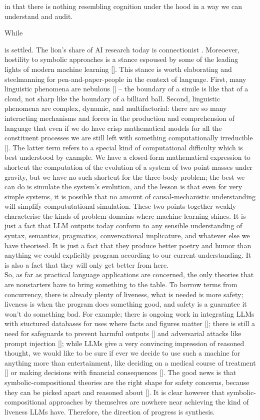 {in that there is nothing resembling cognition under the hood in a way we can understand and audit.

While 

 
} is settled. The lion's share of AI research today is connectionist \cite{}. Moreoever, hostility to symbolic approaches is a stance espoused by some of the leading lights of modern machine learning []. This stance is worth elaborating and steelmanning for pen-and-paper-people in the context of language. First, many linguistic phenomena are nebulous [] -- the boundary of a simile is like that of a cloud, not sharp like the boundary of a billiard ball. Second, linguistic phenomena are complex, dynamic, and multifactorial: there are so many interacting mechanisms and forces in the production and comprehension of language that even if we do have crisp mathematical models for all the constituent processes we are still left with something computationally irreducible []. The latter term refers to a special kind of computational difficulty which is best understood by example. We have a closed-form mathematical expression to shortcut the computation of the evolution of a system of two point masses under gravity, but we have no such shortcut for the three-body problem; the best we can do is simulate the system's evolution, and the lesson is that even for very simple systems, it is possible that no amount of causal-mechanistic understanding will simplify compututational simulation. These two points together weakly characterise the kinds of problem domains where machine learning shines. It is just a fact that LLM outputs today conform to any sensible understanding of syntax, semantics, pragmatics, conversational implicature, and whatever else we have theorised. It is just a fact that they produce better poetry and humor than anything we could explicitly program according to our current understanding. It is also a fact that they will only get better from here.\\

So, as far as practical language applications are concerned, the only theories that are nonstarters have to bring something to the table. To borrow terms from concurrency, there is already plenty of liveness, what is needed is more safety; liveness is when the program does something good, and safety is a guarantee it won't do something bad. For example; there is ongoing work in integrating LLMs with stuctured databases for uses where facts and figures matter []; there is still a need for safeguards to prevent harmful outputs [] and adversarial attacks like prompt injection []; while LLMs give a very convincing impression of reasoned thought, we would like to be sure if ever we decide to use such a machine for anything more than entertainment, like deciding on a medical course of treatment [] or making decisions with financial consequences []. The good news is that symbolic-compositional theories are the right shape for safety concerns, because they can be picked apart and reasoned about []. It is clear however that symbolic-compositional approaches by themselves are nowhere near achieving the kind of liveness LLMs have. Therefore, the direction of progress is synthesis.\\

